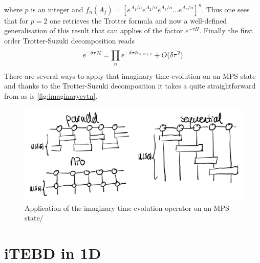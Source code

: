         where $p$ is an integer and $f_n({A_j}) = [e^{A_1/n}e^{A_2/n}e^{A_3/n}...e^{A_p/n}]^n$. Thus one sees that for $p=2$ one retrieves the Trotter formula and now a well-defined generalisation of this result that can applies of the factor $e^{-\tau H}$. Finally the first order Trotter-Suzuki decomposition reads
        \begin{equation}
            e^{-\delta\tau \mathcal H} = \prod_n e^{-\delta\tau h_{n,n+1}} + O(\delta\tau^2)
        \end{equation}
        There are several ways to apply that imaginary time evolution on an MPS state and thanks to the Trotter-Suzuki decomposition it takes a quite straightforward from as is \autoref{fig:imaginaryevtn}.
        
        \begin{figure}[!h]
            \centering
            \includegraphics[scale=0.2]{graphs/imaginaryevtn.png}
            \caption{Application of the imaginary time evolution operator on an MPS state/}
            \label{fig:imaginaryevtn}
        \end{figure}

    \section{iTEBD in 1D}

